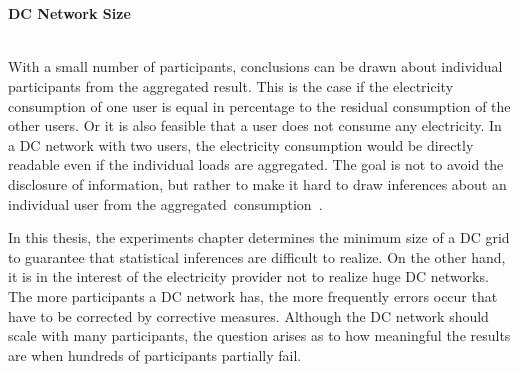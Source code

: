 \\
\\
\textbf{DC Network Size}
\\
\\
\begin{samepage}\enlargethispage{\baselineskip}With a small number of participants, conclusions can be drawn about individual participants from the aggregated result. This is the case if the electricity consumption of one user is equal in percentage to the residual consumption of the other users. Or it is also feasible that a user does not consume any electricity. In a DC network with two users, the electricity consumption would be directly readable even if the individual loads are aggregated. The goal is not to avoid the disclosure of information, but rather to make it hard to draw inferences about an individual user from the \mbox{aggregated consumption~\cite{le2020differential}.}\end{samepage} In this thesis, the experiments chapter determines the minimum size of a DC grid to guarantee that statistical inferences are difficult to realize.
On the other hand, it is in the interest of the electricity provider not to realize huge DC networks. The more participants a DC network has, the more frequently errors occur that have to be corrected by corrective measures. Although the DC network should scale with many participants, the question arises as to how meaningful the results are when hundreds of participants partially fail.%




